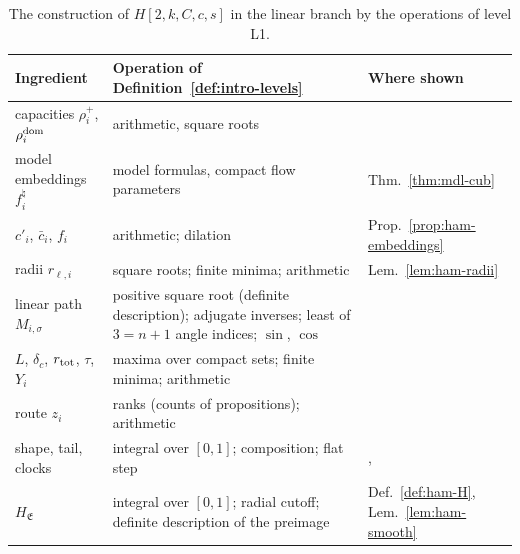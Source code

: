 \begin{table}[!htbp]
\centering\footnotesize
\renewcommand{\arraystretch}{1.15}
\begin{tabular}{@{}L{0.27\textwidth}L{0.4\textwidth}L{0.27\textwidth}@{}}
\toprule
Ingredient & Operation of Definition~\ref{def:intro-levels} & Where shown\\
\midrule
capacities $\rho_i^+$, $\rho_i^{\rm dom}$ & arithmetic, square roots & \\
model embeddings $f^\natural_i$ & model formulas, compact flow parameters & Thm.~\ref{thm:mdl-cub}\\
$c'_i$, $\bar c_i$, $f_i$ & arithmetic; dilation & Prop.~\ref{prop:ham-embeddings}\\
radii $r_{\ell,i}$ & square roots; finite minima; arithmetic & Lem.~\ref{lem:ham-radii}\\
linear path $M_{i,\sigma}$ & positive square root (definite description); adjugate inverses; least of $3=n+1$ angle indices; $\sin$, $\cos$ & \\
$L$, $\delta_c$, $r_{\rm tot}$, $\tau$, $Y_i$ & maxima over compact sets; finite minima; arithmetic & \\
route $z_i$ & ranks (counts of propositions); arithmetic & \\
shape, tail, clocks & integral over $[0,1]$; composition; flat step & , \\
$H_{\mathfrak E}$ & integral over $[0,1]$; radial cutoff; definite description of the preimage & Def.~\ref{def:ham-H}, Lem.~\ref{lem:ham-smooth}\\
\bottomrule
\end{tabular}
\caption{The construction of $H[2,k,C,c,s]$ in the linear branch by the operations of level L1.}
\label{tab:ham-explicit}
\end{table}
